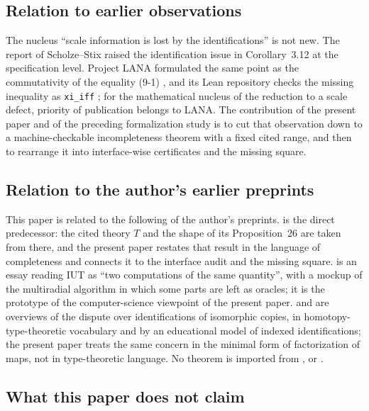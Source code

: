 \documentclass[11pt]{article}
\theoremstyle{plain}
\theoremstyle{definition}
\theoremstyle{remark}
\begin{document}
\subsection*{Relation to earlier observations}

The nucleus ``scale information is lost by the identifications'' is
not new.  The report of Scholze--Stix \cite{SS18} raised the
identification issue in Corollary~3.12 at the specification level.
Project LANA formulated the same point as the commutativity of the
equality (9-1) \cite[\S9.2]{LANA}, and its Lean repository checks
the missing inequality as \texttt{xi\_iff} \cite{lana}; for the
mathematical nucleus of the reduction to a scale defect, priority
of publication belongs to LANA.  The contribution of the present
paper and of the preceding formalization study \cite{U26} is to cut
that observation down to a machine-checkable incompleteness theorem
with a fixed cited range, and then to rearrange it into
interface-wise certificates and the missing square.

\subsection*{Relation to the author's earlier preprints}

This paper is related to the following of the author's preprints.
\cite{U26} is the direct predecessor: the cited theory $T$ and the
shape of its Proposition~26 are taken from there, and the present
paper restates that result in the language of completeness and
connects it to the interface audit and the missing square.
\cite{UCS} is an essay reading IUT as ``two computations of the same
quantity'', with a mockup of the multiradial algorithm in which some
parts are left as oracles; it is the prototype of the
computer-science viewpoint of the present paper.  \cite{UHoTTa} and
\cite{UHoTTb} are overviews of the dispute over identifications of
isomorphic copies, in homotopy-type-theoretic vocabulary and by an
educational model of indexed identifications; the present paper
treats the same concern in the minimal form of factorization of
maps, not in type-theoretic language.  No theorem is imported from
\cite{UCS}, \cite{UHoTTa} or \cite{UHoTTb}.

\subsection*{What this paper does not claim}
\end{document}
